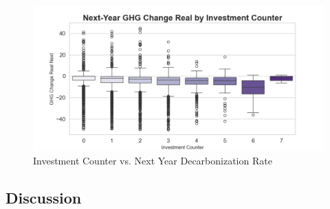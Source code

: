 \begin{figure}[H]
\centering
  \includegraphics[width=\textwidth]{figures/ghg_change_real_next_by_investment_counter.png}
\caption{Investment Counter vs. Next Year Decarbonization Rate}
\label{fig:ghg_change_real_next_by_investment_counter}
\end{figure}




\subsection{Discussion}

